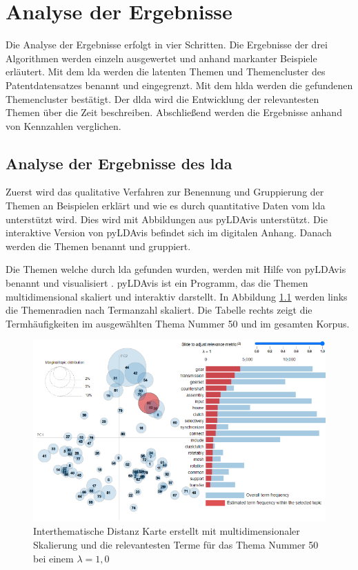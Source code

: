 \chapter{Analyse der Ergebnisse}


Die Analyse der Ergebnisse erfolgt in vier Schritten. Die Ergebnisse der drei Algorithmen werden einzeln ausgewertet und anhand markanter Beispiele erläutert. Mit dem \gls{lda} werden die latenten Themen und Themencluster des Patentdatensatzes benannt und eingegrenzt. Mit dem \gls{hlda} werden die gefundenen Themencluster bestätigt. Der \gls{dlda} wird die Entwicklung der relevantesten Themen über die Zeit beschreiben. Abschließend werden die Ergebnisse anhand von Kennzahlen verglichen.


\section{Analyse der Ergebnisse des \gls{lda}}

Zuerst wird das qualitative Verfahren zur Benennung und Gruppierung der Themen an Beispielen erklärt und wie es durch quantitative Daten vom \gls{lda} unterstützt wird. Dies wird mit Abbildungen aus \gls{pyLDAvis} unterstützt. Die interaktive Version von \gls{pyLDAvis} befindet sich im digitalen Anhang. Danach werden die Themen benannt und gruppiert.

Die Themen welche durch \gls{lda} gefunden wurden, werden mit Hilfe von \gls{pyLDAvis} benannt und visualisiert \parencite[vgl.][S. 63]{sievert2014ldavis}. \gls{pyLDAvis} ist ein Programm, das die Themen multidimensional skaliert und interaktiv darstellt. In Abbildung \ref{fig:clustering_process01} werden links die Themenradien nach Termanzahl skaliert. Die Tabelle rechts zeigt die Termhäufigkeiten im ausgewählten Thema Nummer 50 und im gesamten Korpus.

\begin{landscape}
 \begin{figure}[htpb]
	\centering
	\includegraphics[width=19.29cm,keepaspectratio=true]{img/clustering_process01.png}
	\caption{
		Interthematische Distanz Karte erstellt mit multidimensionaler Skalierung und die relevantesten Terme für das Thema Nummer 50 bei einem $\lambda = 1,0$
	}
	\label{fig:clustering_process01}
 \end{figure}
\end{landscape}

